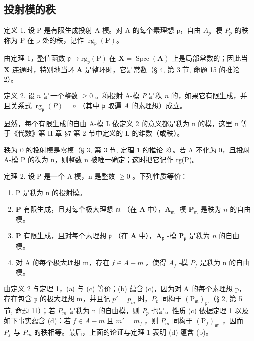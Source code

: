 \subsection{投射模的秩}

定义 1. 设 P 是有限生成投射 A-模。对 A 的每个素理想 p，自由 \(A_{p}\) -模 \(P_{p}\) 的秩称为 P 在 p 处的秩，记作 \(\operatorname{rg}_{\mathfrak{p}}(\mathbf{P})\)。

由定理 1，整值函数 \(\mathfrak{p} \mapsto \mathrm{rg}_{\mathfrak{p}}(\mathrm{P})\) 在 \(\mathbf{X} = \operatorname{Spec}(\mathbf{A})\) 上是局部常数的；因此当 \(\mathbf{X}\) 连通时，特别地当环 \(\mathbf{A}\) 是整环时，它是常数（§ 4, 第 3 节, 命题 15 的推论 2）。

定义 2. 设 \(n\) 是一个整数 \(\geqslant 0\) 。称投射 A-模 \(P\) 是秩 \(n\) 的，如果它有限生成，并且关系式 \(\operatorname{rg}_{\mathfrak{p}}(P) = n\) （其中 \(\mathfrak{p}\) 取遍 \(A\) 的素理想）成立。

显然，每个有限生成的自由 A-模 L 依定义 2 的意义都是秩为 n 的模，这里 n 等于《代数》第 II 章 §7 第 2 节中定义的 L 的维数（或秩）。

秩为 0 的投射模是零模（§ 3, 第 3 节, 定理 1 的推论 2）。若 A 不化为 0，且投射 A-模 P 的秩为 n，则整数 n 被唯一确定；这时把它记作 rg(P)。

定理 2. 设 P 是一个 A-模，n 是整数 \(\geqslant 0\) 。下列性质等价：

\begin{enumerate}
\def\labelenumi{(\alph{enumi})}
\item
  P 是秩为 n 的投射模。
\item
  \(\mathbf{P}\) 有限生成，且对每个极大理想 \(\mathfrak{m}\) （在 \(\mathbf{A}\) 中），\(\mathbf{A}_{\mathfrak{m}}\) -模 \(\mathbf{P}_{\mathfrak{m}}\) 是秩为 \(n\) 的自由模。
\item
  \(\mathbf{P}\) 有限生成，且对每个素理想 \(\mathfrak{p}\) （在 \(\mathbf{A}\) 中），\(\mathbf{A}_{\mathfrak{p}}\) -模 \(\mathbf{P}_{\mathfrak{p}}\) 是秩为 \(n\) 的自由模。
\item
  对 A 的每个极大理想 m，存在 \(f \in A - m\) ，使得 \(A_{f}\) -模 \(P_{f}\) 是秩为 n 的自由模。
\end{enumerate}

由定义 2 与定理 1，(a) 与 (c) 等价；(b) 蕴含 (c)，因为对 A 的每个素理想 p，存在包含 p 的极大理想 m，并且记 \(p' = p_{m}\) 时，\(P_{p}\) 同构于 \((\mathrm{P}_{\mathfrak{m}})_{\mathfrak{p'}}\)（§ 2, 第 5 节, 命题 11）；若 \(P_{m}\) 是秩为 n 的自由模，则 \(P_{p}\) 也是。性质 (c) 依据定理 1 以及如下事实蕴含 (d)：若 \(f \in A - m\) 且 \(m' = m_{f}\) ，则 \(P_{m}\) 同构于 \((\mathrm{P}_{f})_{\mathfrak{m'}}\) ，因而 \(P_{f}\) 与 \(P_{m}\) 的秩相等。最后，上面的论证与定理 1 表明 (d) 蕴含 (b)。

